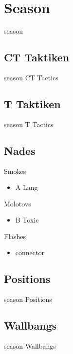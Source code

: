 \newpage




\chapter{Season}
\label{chap:season}
season

\section{CT Taktiken}
\label{sect:season_ct}
season CT Tactics

\section{T Taktiken}
\label{sect:season_t}
season T Tactics

\section{Nades}
\label{sect:season_nades}
Smokes
\begin{itemize}
\item A Lang
\end{itemize}

Molotovs
\begin{itemize}
\item B Toxic
\end{itemize}

Flashes
\begin{itemize}
\item connector
\end{itemize}

\section{Positions}
\label{sect:season_positions}
season Positions

\section{Wallbangs}
\label{sect:season_wallbangs}
season Wallbangs
